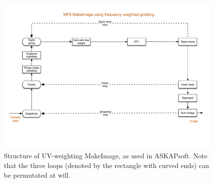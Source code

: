 \documentclass[11pt,a4paper,variablewidth]{article}
\begin{document}
\begin{figure}[htb]
  \centering
  \includegraphics[width=\textwidth]{./MSMFS_MakeImage_UV.pdf}
  \caption{Structure of UV-weighting MakeImage, as used in ASKAPsoft. Note that the three loops (denoted by the rectangle with curved ends) can be permutated at will.}
  \label{fig:predictimage}
\end{figure}


\clearpage
\end{document}
